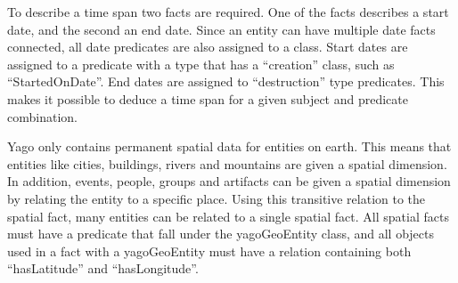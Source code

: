 To describe a time span two facts are required. One of the facts describes a start date, and the second an end date. Since an entity can have multiple date facts connected, all date predicates are also assigned to a class. Start dates are assigned to a predicate with a type that has a ``creation'' class, such as ``StartedOnDate''. End dates are assigned to ``destruction'' type predicates. This makes it possible to deduce a time span for a given subject and predicate combination\cite{yago}.

Yago only contains permanent spatial data for entities on earth. This means that entities like cities, buildings, rivers and mountains are given a spatial dimension. In addition, events, people, groups and artifacts can be given a spatial dimension by relating the entity to a specific place. Using this transitive relation to the spatial fact, many entities can be related to a single spatial fact. All spatial facts must have a predicate that fall under the yagoGeoEntity class, and all objects used in a fact with a yagoGeoEntity must have a relation containing both ``hasLatitude'' and ``hasLongitude''.

